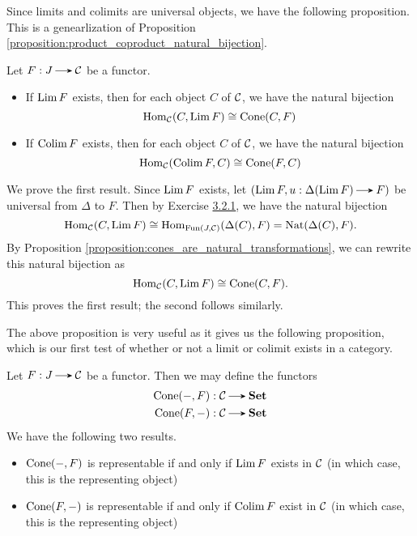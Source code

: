     Since limits and colimits are universal objects, we have the following proposition.
    This is a genearlization of Proposition \ref{proposition:product_coproduct_natural_bijection}.
    \begin{proposition}\label{proposition:limit_cone_set_natural_bijection}
        Let $F: J \to \cc$ be a functor. 
        \begin{itemize}
            \item If $\operatorname*{\mathrm{Lim }} F$ exists, then for each object $C$ of $\mathcal{C}$, we have the 
            natural bijection 
            \[
                \operatorname{\mathrm{Hom}}_{\mathcal{C}}(C, \operatorname*{\mathrm{Lim }} F) \cong \text{Cone}(C, F)
            \]
            \item If $\operatorname*{\mathrm{Colim }} F$ exists, then for each object $C$ of $\mathcal{C}$, 
            we have the natural bijection 
            \[
                \operatorname{\mathrm{Hom}}_{\mathcal{C}}(\operatorname*{\mathrm{Colim }} F, C) \cong \text{Cone}(F, C)
            \]
        \end{itemize}
    \end{proposition}

    \begin{prf}
        We prove the first result.
        Since $\operatorname*{\mathrm{Lim }} F$ exists, let $(\Lim F, u: \Delta(\Lim F) \to F)$ be universal 
        from $\Delta$ to $F$. Then by Exercise \hyperref[exercise:universality_bijection]{3.2.1}, 
        we have the natural bijection 
        \[
            \operatorname{\mathrm{Hom}}_{\mathcal{C}}(C, \operatorname*{\mathrm{Lim }} F) \cong \operatorname{\mathrm{Hom}}_{\text{Fun}(J, \mathcal{C})}(\Delta(C), F) = \operatorname{\mathrm{Nat}}(\Delta(C), F).
        \]
        By Proposition \ref{proposition:cones_are_natural_transformations}, we can rewrite this 
        natural bijection as 
        \[
            \operatorname{\mathrm{Hom}}_{\mathcal{C}}(C, \operatorname*{\mathrm{Lim }} F) \cong \text{Cone}(C, F).
        \]
        This proves the first result; the second follows similarly. 
    \end{prf}

    The above proposition is very useful as it gives us the following proposition, 
    which is our first test
    of whether or not a limit or colimit exists in a category. 

    \begin{proposition}
        Let $F: J \to \cc$ be a functor. Then we may define the functors 
        \begin{align*}
            \cone(-, F): \cc \to \textbf{Set}\\
            \cone(F, -): \cc \to \textbf{Set}
        \end{align*}
        We have the following two results.
        \begin{itemize}
            \item $\operatorname{\mathrm{Cone}}(-, F)$ is representable if and only if $\operatorname*{\mathrm{Lim }} F$ exists in $\mathcal{C}$
            (in which case, this is the representing object)
            \item $\operatorname{\mathrm{Cone}}(F, -)$ is representable if and only if $\operatorname*{\mathrm{Colim }} F$ exist in $\mathcal{C}$
            (in which case, this is the representing object)
        \end{itemize}
    \end{proposition}


